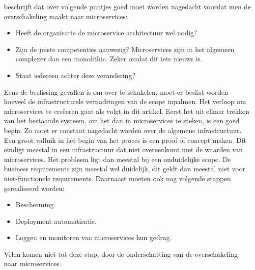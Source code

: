 \textcite{Benetis2016a} beschrijft dat over volgende puntjes goed moet worden nagedacht voordat men de overschakeling maakt naar microservices:
\begin{itemize}
	\item Heeft de organisatie de microservice architectuur wel nodig?
	\item Zijn de juiste competenties aanwezig? Microservices zijn in het algemeen complexer dan een monolithic. Zeker omdat dit iets nieuws is. 
	\item  Staat iedereen achter deze verandering?
\end{itemize}
Eens de beslissing gevallen is om over te schakelen, moet er beslist worden hoeveel de infrastructurele vernadringen van de scope inpalmen. Het verloop om microservices te creëeren gaat als volgt in dit artikel. Eerst het uit elkaar trekken van het bestaande systeem, om het dan in microservices te steken, is een goed begin. Zo moet er constant nagedacht worden over de algemene infrastructuur. Een groot valluik in het begin van het proces is een proof of concept maken. Dit eindigt meestal in een infrastructuur dat niet overeenkomt met de waarden van microservices. Het probleem ligt dan meestal bij een onduidelijke scope. De business requirements zijn meestal wel duidelijk, dit geldt dan meestal niet voor niet-functionele requirements. Daarnaast moeten ook nog volgende stappen gerealiseerd worden:
\begin{itemize}
	\item Bescherming.
	\item Deployment automatisatie.
	\item Loggen en monitoren van microservices hun gedrag.
\end{itemize}
Velen komen niet tot deze stap, door de onderschatting van de overschakeling naar microservices.

